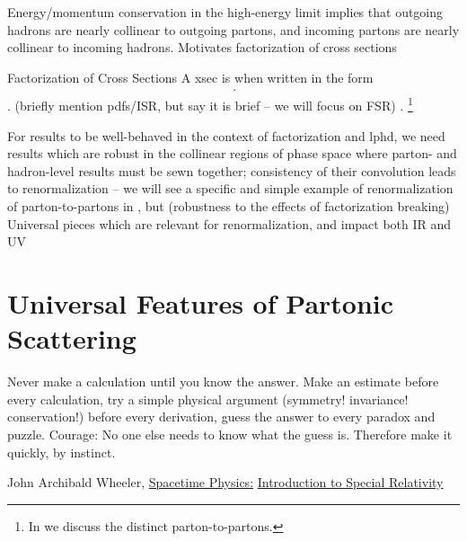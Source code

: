 Energy/momentum conservation in the high-energy limit implies that outgoing hadrons are nearly collinear to outgoing partons, and incoming partons are nearly collinear to incoming hadrons.
%
Motivates factorization of cross sections 
%
\begin{definitionbox}{Factorization of Cross Sections}{}
    A \gls{xsec} is  when written in the form
    \begin{align}
        \,.
    \end{align}
     .
    (briefly mention pdfs/ISR, but say it is brief -- we will focus on FSR)
     .%
    \footnote{In \Sec{} we discuss the distinct \glspl{parton-to-parton}.}
\end{definitionbox}


For results to be well-behaved in the context of factorization and \gls{lphd}, we need results which are robust in the collinear regions of phase space where parton- and hadron-level results must be sewn together;
%
consistency of their convolution leads to renormalization -- we will see a specific and simple example of renormalization of \glspl{parton-to-parton} in \Sec{}, but 
%
(robustness to the effects of factorization breaking)
%
Universal pieces which are relevant for renormalization, and impact both IR and UV




\section{Universal Features of Partonic Scattering}
\label{sec:universal-features}


\epigraph{
    Never make a calculation until you know the answer.
    Make an estimate before every calculation, try a simple physical argument (symmetry! invariance! conservation!) before every derivation, guess the answer to every paradox and puzzle.
    Courage: No one else needs to know what the guess is.
    Therefore make it quickly, by instinct.
}
{
John Archibald Wheeler, \underline{Spacetime Physics:} \underline{Introduction to Special Relativity}
}


